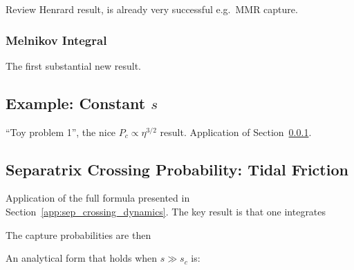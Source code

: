 \documentclass[
        fleqn,
        usenatbib,
        referee,
    ]{mnras}
\begin{document}
Review Henrard result, is already very successful e.g.\ MMR capture.

\subsubsection{Melnikov Integral}\label{sss:Melnikov}

The first substantial new result.

\subsection{Example: Constant $s$}

``Toy problem 1'', the nice $P_c \propto \eta^{3/2}$ result. Application of
Section~\ref{sss:Melnikov}.

\subsection{Separatrix Crossing Probability: Tidal Friction}\label{app:probs}

Application of the full formula presented in
Section~\ref{app:sep_crossing_dynamics}. The key result is that one integrates


The capture probabilities are then


An analytical form that holds when $s \gg s_c$ is:


\bsp
\label{lastpage} %
\end{document}
